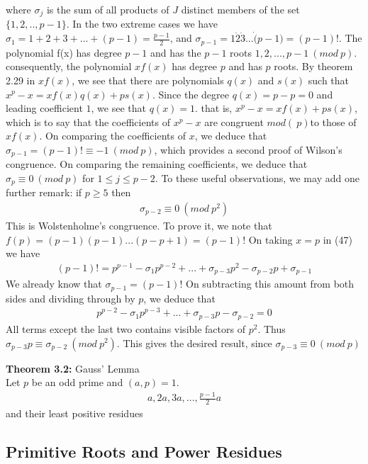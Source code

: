 \documentclass[a4paper]{article}
\begin{document}
where $\sigma_j$ is the sum of all products of $J$ distinct members of the set $\{1,2,..,p-1\}$. In the two extreme cases we have $\sigma_1=1+2+3+...+(p-1)=\frac{p-1}{2}$, and $\sigma_{p-1}=1\dot2\dot3\dot...\dot(p-1)=(p-1)!$. The polynomial f(x) has degree $p-1$ and has the $p-1$ roots $1,2,...,p-1\ (mod\ p)$. consequently, the polynomial $xf(x)$ has degree $p$ and has $p$ roots. By theorem 2.29 in $xf(x)$, we see that there are polynomials $q(x)$ and $s(x)$ such that $x^p-x=xf(x)q(x)+ps(x)$. Since the degree $q(x)=p-p=0$ and leading coefficient $1$, we see that $q(x)=1$. that is, $x^p-x=xf(x)+ps(x)$, which is to say that the coefficients of $x^p-x$ are congruent $mod(\ p)$to those of $xf(x)$. On comparing the coefficients of $x$, we deduce that $\sigma_{p-1}=(p-1)!\equiv -1\ (mod\ p)$, which provides a second proof of Wilson's congruence. On comparing the remaining coefficients, we deduce that $\sigma_{p}\equiv 0\ (mod\ p)$ for $1\leq j\leq p-2$. To these useful observations, we may add one further remark: if $p\geq 5$ then
\begin{align*}
    \sigma_{p-2}\equiv 0\ (mod\ p^2)
\end{align*}
This is Wolstenholme's congruence. To prove it, we note that $f(p)=(p-1)(p-1)...(p-p+1)=(p-1)!$ On taking $x=p$ in (47) we have
\begin{align*}
    (p-1)! = p^{p-1}-\sigma_1p^{p-2}+...+\sigma_{p-3}p^2-\sigma_{p-2}p+\sigma_{p-1}
\end{align*}
We already know that $\sigma_{p-1}=(p-1)!$ On subtracting this amount from both sides and dividing through by $p$, we deduce that
\begin{align*}
    p^{p-2}-\sigma_{1}p^{p-3}+...+\sigma_{p-3}p-\sigma_{p-2}=0
\end{align*}
All terms except the last two contains visible factors of $p^2$. Thus $\sigma_{p-3}p\equiv \sigma_{p-2}\ (mod\ p^2)$. This gives the desired result, since $\sigma_{p-3}\equiv 0\ (mod\ p)$

\textbf{Theorem 3.2:} Gauss' Lemma\\
Let $p$ be an odd prime and $(a,p)=1$.
\begin{align}
    a,2a,3a,...,\frac{p-1}{2}a
\end{align}
and their least positive residues


\subsection{Primitive Roots and Power Residues}
\end{document}

